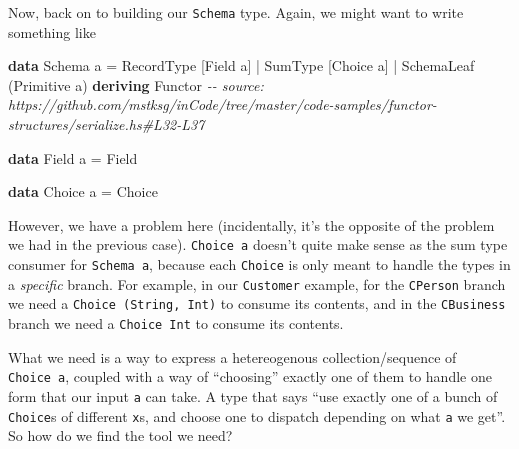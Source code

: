 \documentclass[]{article}
\newenvironment{Shaded}{}{}
\newcommand{\CommentTok}[1]{\textcolor[rgb]{0.38,0.63,0.69}{\textit{#1}}}
\newcommand{\DataTypeTok}[1]{\textcolor[rgb]{0.56,0.13,0.00}{#1}}
\newcommand{\KeywordTok}[1]{\textcolor[rgb]{0.00,0.44,0.13}{\textbf{#1}}}
\newcommand{\NormalTok}[1]{#1}
\newcommand{\OperatorTok}[1]{\textcolor[rgb]{0.40,0.40,0.40}{#1}}
\newcommand{\OtherTok}[1]{\textcolor[rgb]{0.00,0.44,0.13}{#1}}
\begin{document}
Now, back on to building our \texttt{Schema} type. Again, we might want to write
something like

\begin{Shaded}
\begin{Highlighting}[]
\KeywordTok{data} \DataTypeTok{Schema}\NormalTok{ a }\OtherTok{=}
      \DataTypeTok{RecordType}\NormalTok{  [}\DataTypeTok{Field}\NormalTok{ a]}
    \OperatorTok{|} \DataTypeTok{SumType}\NormalTok{     [}\DataTypeTok{Choice}\NormalTok{ a]}
    \OperatorTok{|} \DataTypeTok{SchemaLeaf}\NormalTok{  (}\DataTypeTok{Primitive}\NormalTok{ a)}
  \KeywordTok{deriving} \DataTypeTok{Functor}
\CommentTok{{-}{-} source: https://github.com/mstksg/inCode/tree/master/code{-}samples/functor{-}structures/serialize.hs\#L32{-}L37}

\KeywordTok{data} \DataTypeTok{Field}\NormalTok{ a }\OtherTok{=} \DataTypeTok{Field}

\KeywordTok{data} \DataTypeTok{Choice}\NormalTok{ a }\OtherTok{=} \DataTypeTok{Choice}
\end{Highlighting}
\end{Shaded}

However, we have a problem here (incidentally, it's the opposite of the problem
we had in the previous case). \texttt{Choice\ a} doesn't quite make sense as the
sum type consumer for \texttt{Schema\ a}, because each \texttt{Choice} is only
meant to handle the types in a \emph{specific} branch. For example, in our
\texttt{Customer} example, for the \texttt{CPerson} branch we need a
\texttt{Choice\ (String,\ Int)} to consume its contents, and in the
\texttt{CBusiness} branch we need a \texttt{Choice\ Int} to consume its
contents.

What we need is a way to express a hetereogenous collection/sequence of
\texttt{Choice\ a}, coupled with a way of ``choosing'' exactly one of them to
handle one form that our input \texttt{a} can take. A type that says ``use
exactly one of a bunch of \texttt{Choice}s of different \texttt{x}s, and choose
one to dispatch depending on what \texttt{a} we get''. So how do we find the
tool we need?
\end{document}
